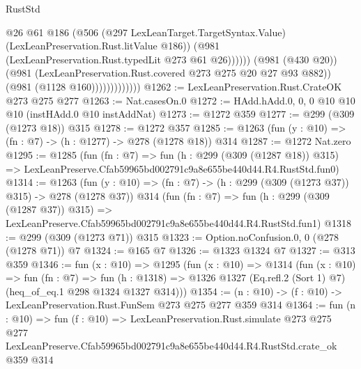 \begin{lexlean}{RustStd}
\begin{coremodule}
                                  @26
                                  @61
                                  @186
                                  (@506
                                    (@297 LexLeanTarget.TargetSyntax.Value)
                                    (LexLeanPreservation.Rust.litValue @186))
                                  (@981 (LexLeanPreservation.Rust.typedLit @273 @61 @26))))))
                          (@981 (@430 @20))
                          (@981 (LexLeanPreservation.Rust.covered @273 @275 @20 @27 @93 @882))
                          (@981 (@1128 @160)))))))))))))
@1262 := LexLeanPreservation.Rust.CrateOK @273 @275 @277
@1263 := Nat.casesOn.{0}
@1272 := HAdd.hAdd.{0, 0, 0} @10 @10 @10 (instHAdd.{0} @10 instAddNat)
@1273 := @1272 @359
@1277 := @299 (@309 (@1273 @18)) @315
@1278 := @1272 @357
@1285 := @1263 (fun (y : @10) => (fn : @7) -> (h : @1277) -> @278 (@1278 @18)) @314
@1287 := @1272 Nat.zero
@1295 := @1285
    (fun (fn : @7) =>
    fun (h : @299 (@309 (@1287 @18)) @315) =>
    LexLeanPreserve.Cfab59965bd002791c9a8e655be440d44.R4.RustStd.fun0)
@1314 := @1263
    (fun (y : @10) => (fn : @7) -> (h : @299 (@309 (@1273 @37)) @315) -> @278 (@1278 @37))
    @314
    (fun (fn : @7) =>
    fun (h : @299 (@309 (@1287 @37)) @315) =>
    LexLeanPreserve.Cfab59965bd002791c9a8e655be440d44.R4.RustStd.fun1)
@1318 := @299 (@309 (@1273 @71)) @315
@1323 := Option.noConfusion.{0, 0} (@278 (@1278 @71)) @7
@1324 := @165 @7
@1326 := @1323 @1324 @7
@1327 := @313 @359
@1346 := fun (x : @10) =>
  @1295
    (fun (x : @10) =>
    @1314
      (fun (x : @10) =>
      fun (fn : @7) =>
      fun (h : @1318) =>
      @1326 @1327 (Eq.refl.{2} (Sort 1) @7) (heq_of_eq.{1} @298 @1324 @1327 @314)))
@1354 := (n : @10) -> (f : @10) -> LexLeanPreservation.Rust.FunSem @273 @275 @277 @359 @314
@1364 := fun (n : @10) =>
  fun (f : @10) =>
  LexLeanPreservation.Rust.simulate
    @273
    @275
    @277
    LexLeanPreserve.Cfab59965bd002791c9a8e655be440d44.R4.RustStd.crate_ok
    @359
    @314
\end{coremodule}
\end{lexlean}
